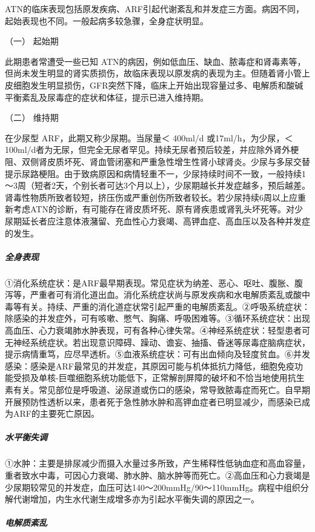 ATN的临床表现包括原发疾病、ARF引起代谢紊乱和并发症三方面。病因不同，起始表现也不同。一般起病多较急骤，全身症状明显。

\hypertarget{text00083.htmlux5cux23CHP3-7-5-2-1}{}
（一） 起始期

此期患者常遭受一些已知
ATN的病因，例如低血压、缺血、脓毒症和肾毒素等，但尚未发生明显的肾实质损伤，故临床表现以原发病的表现为主。但随着肾小管上皮细胞发生明显损伤，GFR突然下降，临床上开始出现容量过多、电解质和酸碱平衡紊乱及尿毒症的症状和体征，提示已进入维持期。

\hypertarget{text00083.htmlux5cux23CHP3-7-5-2-2}{}
（二） 维持期

在少尿型 ARF，此期又称少尿期。当尿量＜ 400ml/d 或17ml/h，为少尿，＜
100ml/d者为无尿，但完全无尿者罕见。持续无尿者预后较差，并应除外肾外梗阻、双侧肾皮质坏死、肾血管闭塞和严重急性增生性肾小球肾炎。少尿与多尿交替提示尿路梗阻。由于致病原因和病情轻重不一，少尿持续时间不一致，一般持续1～3周（短者2天，个别长者可达3个月以上），少尿期越长并发症越多，预后越差。肾毒性物质所致者较短，挤压伤或严重创伤所致者较长。若少尿持续6周以上应重新考虑ATN的诊断，有可能存在肾皮质坏死、原有肾疾患或肾乳头坏死等。对少尿期延长者应注意体液潴留、充血性心力衰竭、高钾血症、高血压以及各种并发症的发生。

\subparagraph{全身表现}

①消化系统症状：是ARF最早期表现。常见症状为纳差、恶心、呕吐、腹胀、腹泻等，严重者可有消化道出血。消化系统症状尚与原发疾病和水电解质紊乱或酸中毒等有关。持续、严重的消化道症状常引起严重的电解质紊乱。②呼吸系统症状：除感染的并发症外，可有咳嗽、憋气、胸痛、呼吸困难等。③循环系统症状：出现高血压、心力衰竭肺水肿表现，可有各种心律失常。④神经系统症状：轻型患者可无神经系统症状。若出现意识障碍、躁动、谵妄、抽搐、昏迷等尿毒症脑病症状，提示病情重笃，应尽早透析。⑤血液系统症状：可有出血倾向及轻度贫血。⑥并发感染：感染是ARF最常见的并发症，其原因可能与机体抵抗力降低，细胞免疫功能受损及单核-巨噬细胞系统功能低下，正常解剖屏障的破坏和不恰当地使用抗生素有关。常见部位是呼吸道、泌尿道或伤口的感染，常导致脓毒症而死亡。自早期开展预防性透析以来，患者死于急性肺水肿和高钾血症者已明显减少，而感染已成为ARF的主要死亡原因。

\subparagraph{水平衡失调}

①水肿：主要是排尿减少而摄入水量过多所致，产生稀释性低钠血症和高血容量，重者致水中毒，可因心力衰竭、肺水肿、脑水肿等而死亡。②高血压和心力衰竭是少尿期较常见的并发症，血压可达140～200mmHg/90～110mmHg。病程中组织分解代谢增加，内生水代谢生成增多亦为引起水平衡失调的原因之一。

\subparagraph{电解质紊乱}

